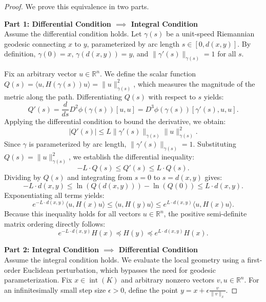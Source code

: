 \begin{proof}
We prove this equivalence in two parts.

\noindent \textbf{Part 1: Differential Condition $\implies$ Integral Condition}\\
Assume the differential condition holds. Let $\gamma(s)$ be a unit-speed Riemannian geodesic connecting $x$ to $y$, parameterized by arc length $s \in [0, d(x,y)]$. By definition, $\gamma(0) = x$, $\gamma(d(x,y)) = y$, and $\|\gamma'(s)\|_{\gamma(s)} = 1$ for all $s$.

Fix an arbitrary vector $u \in \mathbb{R}^n$. We define the scalar function $Q(s) = \langle u, H(\gamma(s)) u \rangle = \|u\|_{\gamma(s)}^2$, which measures the magnitude of the metric along the path. Differentiating $Q(s)$ with respect to $s$ yields:
\begin{equation}
    Q'(s) = \frac{d}{ds} D^2\phi(\gamma(s))[u, u] = D^3\phi(\gamma(s))[\gamma'(s), u, u].
\end{equation}
Applying the differential condition to bound the derivative, we obtain:
\begin{equation}
    |Q'(s)| \le L \|\gamma'(s)\|_{\gamma(s)} \|u\|_{\gamma(s)}^2.
\end{equation}
Since $\gamma$ is parameterized by arc length, $\|\gamma'(s)\|_{\gamma(s)} = 1$. Substituting $Q(s) = \|u\|_{\gamma(s)}^2$, we establish the differential inequality:
\begin{equation}
    -L \cdot Q(s) \le Q'(s) \le L \cdot Q(s).
\end{equation}
Dividing by $Q(s)$ and integrating from $s = 0$ to $s = d(x,y)$ gives:
\begin{equation}
    -L \cdot d(x,y) \le \ln(Q(d(x,y))) - \ln(Q(0)) \le L \cdot d(x,y).
\end{equation}
Exponentiating all terms yields:
\begin{equation}
    e^{-L \cdot d(x,y)} \langle u, H(x) u \rangle \le \langle u, H(y) u \rangle \le e^{L \cdot d(x,y)} \langle u, H(x) u \rangle.
\end{equation}
Because this inequality holds for all vectors $u \in \mathbb{R}^n$, the positive semi-definite matrix ordering directly follows:
\begin{equation}
    e^{-L \cdot d(x,y)} H(x) \preceq H(y) \preceq e^{L \cdot d(x,y)} H(x).
\end{equation}

\noindent \textbf{Part 2: Integral Condition $\implies$ Differential Condition}\\
Assume the integral condition holds. We evaluate the local geometry using a first-order Euclidean perturbation, which bypasses the need for geodesic parameterization. Fix $x \in \operatorname{int}(K)$ and arbitrary nonzero vectors $v, u \in \mathbb{R}^n$. For an infinitesimally small step size $\epsilon > 0$, define the point $y = x + \epsilon \frac{v}{\|v\|_x}$.


\end{proof}

